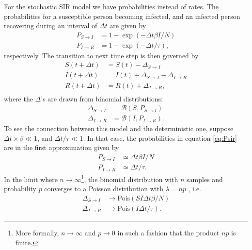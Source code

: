 For the stochastic SIR model we have probabilities instead of rates. The probabilities for a susceptible person becoming infected, and an infected person recovering during an interval of $\Delta t$ are given by
\begin{subequations}\label{eq:Psir}
	\begin{align}
		P_{S\to I} &= 1- \exp{(-\Delta t \beta I /N)} \\
		P_{I\to R} &= 1- \exp{(-\Delta t /\tau)},
	\end{align}
\end{subequations}
respectively. The transition to next time step is then governed by 
\begin{subequations}\label{eq:sir_disc}
	\begin{align}
		S(t + \Delta t) &= S(t) - \Delta_{S\to I} \\
		I(t + \Delta t) &= I(t) + \Delta_{S\to I} - \Delta_{I\to R} \\
		R(t + \Delta t) &= R(t) + \Delta_{I \to R}, \\
	\end{align}
\end{subequations}
where the $\Delta$'s are drawn from binomial distributions:
\begin{subequations}
	\begin{align*}
		\Delta_{S\to I } &= \mathcal{B}(S,P_{S \to I}) \\
		\Delta_{I\to R } &= \mathcal{B}(I,P_{I \to R}).
	\end{align*}
\end{subequations}
To see the connection between this model and the deterministic one, suppose $\Delta t \times \beta \ll 1$, and $\Delta t/\tau \ll 1$. In that case, the probabilities in equation \eqref{eq:Psir} are in the first approximation given by
\begin{subequations}
	\begin{align}
		P_{S\to I} &\simeq \Delta t \beta I/N \\
		P_{I\to R} &\simeq \Delta t/\tau. 
	\end{align}
\end{subequations}
In the limit where $n\to \infty$\footnote{More formally, $n\to \infty$ and $p\to 0$ in such a fashion that the product $np$ is finite. }, the binomial distribution with $n$ samples and probability $p$ converges to a Poisson distribution with $\lambda = np$ \cite{Wassermann}, i.e. 
\begin{subequations}
	\begin{align}
		\Delta_{S\to I} &\to \mathrm{Pois}(SI \Delta t \beta/N) \\
		\Delta_{I\to R} &\to \mathrm{Pois}(I \Delta t/\tau).
	\end{align}
\end{subequations}
